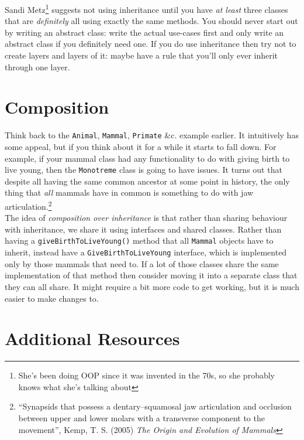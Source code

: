 Sandi Metz\footnote{She's been doing OOP since it was invented in the 70s, so she probably knows what she's talking about} suggests not using inheritance until you have \textit{at least} three classes that are \textit{definitely} all using exactly the same methods. You should never start out by writing an abstract class: write the actual use-cases first and only write an abstract class if you definitely need one. If you do use inheritance then try not to create layers and layers of it: maybe have a rule that you'll only ever inherit through one layer.




\section{Composition}


Think back to the \texttt{Animal}, \texttt{Mammal}, \texttt{Primate} \&c. example earlier. It intuitively has some appeal, but if you think about it for a while it starts to fall down. For example, if your mammal class had any functionality to do with giving birth to live young, then the \texttt{Monotreme} class is going to have issues. It turns out that despite all having the same common ancestor at some point in history, the only thing that \textit{all} mammals have in common is something to do with jaw articulation.\footnote{``Synapsids that possess a dentary–squamosal jaw articulation and occlusion between upper and lower molars with a transverse component to the movement'', Kemp, T. S. (2005) \textit{The Origin and Evolution of Mammals}}
\\

The idea of \textit{composition over inheritance} is that rather than sharing behaviour with inheritance, we share it using interfaces and shared classes. Rather than having a \texttt{giveBirthToLiveYoung()} method that all \texttt{Mammal} objects have to inherit, instead have a \texttt{GiveBirthToLiveYoung} interface, which is implemented only by those mammals that need to. If a lot of those classes share the same implementation of that method then consider moving it into a separate class that they can all share. It might require a bit more code to get working, but it is much easier to make changes to.


\pagebreak

\section{Additional Resources}


